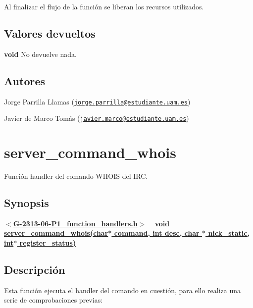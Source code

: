 Al finalizar el flujo de la función se liberan los recursos utilizados.\hypertarget{server_command_away_return_away}{}\subsection{Valores devueltos}\label{server_command_away_return_away}

\begin{DoxyItemize}
\item {\bfseries void} No devuelve nada. 
\end{DoxyItemize}\hypertarget{server_command_away_authors_away}{}\subsection{Autores}\label{server_command_away_authors_away}

\begin{DoxyItemize}
\item Jorge Parrilla Llamas (\href{mailto:jorge.parrilla@estudiante.uam.es}{\tt jorge.\+parrilla@estudiante.\+uam.\+es}) 
\item Javier de Marco Tomás (\href{mailto:javier.marco@estudiante.uam.es}{\tt javier.\+marco@estudiante.\+uam.\+es}) 
\end{DoxyItemize}\hypertarget{server_command_whois}{}\section{server\+\_\+command\+\_\+whois}\label{server_command_whois}
Función handler del comando W\+H\+O\+I\+S del I\+R\+C.\hypertarget{server_command_whois_synopsis_whois}{}\subsection{Synopsis}\label{server_command_whois_synopsis_whois}
{ {\bfseries $<$\hyperlink{G-2313-06-P1__function__handlers_8h}{G-\/2313-\/06-\/\+P1\+\_\+function\+\_\+handlers.\+h}$>$} ~\newline
 {\bfseries void \hyperlink{G-2313-06-P1__function__handlers_8c_a8bb934f01707fcb12ebac41f1fe69441}{server\+\_\+command\+\_\+whois(char$\ast$ command, int desc, char $\ast$ nick\+\_\+static, int$\ast$ register\+\_\+status)}} } \hypertarget{server_command_whois_descripcion_whois}{}\subsection{Descripción}\label{server_command_whois_descripcion_whois}
Esta función ejecuta el handler del comando en cuestión, para ello realiza una serie de comprobaciones previas\+:


